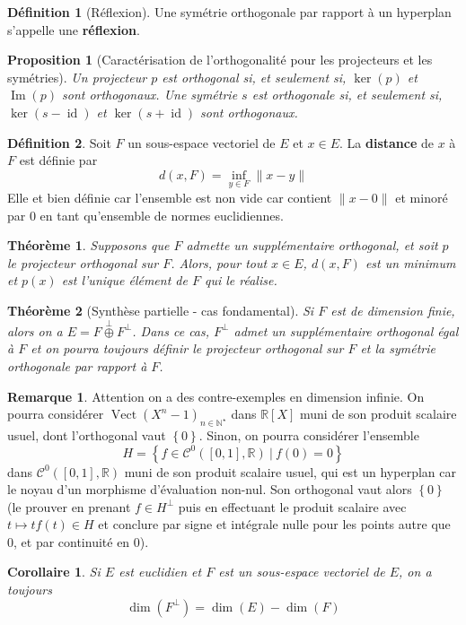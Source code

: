 \documentclass[french]{book}
\newcommand{\N}{\mathbb{N}}
\newcommand{\R}{\mathbb{R}}
\newcommand{\st}{^\star}
\theoremstyle{plain}
\newtheorem{thm}{Théorème}[chapter]
\newtheorem{prop}{Proposition}[chapter]
\newtheorem{cor}{Corollaire}[chapter]
\theoremstyle{definition}
\newtheorem{dfn}{Définition}[chapter]
\newtheorem{rmq}{Remarque}[chapter]
\theoremstyle{remark}
\DeclareMathOperator{\vect}{Vect}
\DeclareMathOperator{\id}{id}
\DeclareMathOperator{\im}{Im}
\begin{document}
\begin{dfn}[Réflexion]
	Une symétrie orthogonale par rapport à un hyperplan s'appelle une \textbf{réflexion}.
\end{dfn}
\begin{prop}[Caractérisation de l'orthogonalité pour les projecteurs et les symétries]
	Un projecteur $p$ est orthogonal si, et seulement si, $\ker(p)$ et $\im(p)$ sont orthogonaux. Une symétrie $s$ est orthogonale si, et seulement si, $\ker(s-\id)$ et $\ker(s+\id)$ sont orthogonaux.
\end{prop}
\begin{dfn}
	Soit $F$ un sous-espace vectoriel de $E$ et $x\in E$. La \textbf{distance} de $x$ à $F$ est définie par $$d(x,F)=\underset{y\in F}{\inf}\lVert x-y\rVert$$ Elle et bien définie car l'ensemble est non vide car contient $\lVert x-0\rVert$ et minoré par $0$ en tant qu'ensemble de normes euclidiennes.
\end{dfn}
\begin{thm}
	Supposons que $F$ admette un supplémentaire orthogonal, et soit $p$ le projecteur orthogonal sur $F$. Alors, pour tout $x\in E$, $d(x,F)$ est un minimum et $p(x)$ est l'unique élément de $F$ qui le réalise.
\end{thm}
\begin{thm}[Synthèse partielle - cas fondamental]
	Si $F$ est de dimension finie, alors on a $E=F\overset{\perp}{\oplus}F^\perp$. Dans ce cas, $F^\perp$ admet un supplémentaire orthogonal égal à $F$ et on pourra toujours définir le projecteur orthogonal sur $F$ et la symétrie orthogonale par rapport à $F$.
\end{thm}
\begin{rmq} Attention on a des contre-exemples en dimension infinie. On pourra considérer $\vect(X^n-1)_{n\in\N\st}$ dans $\R[X]$ muni de son produit scalaire usuel, dont l'orthogonal vaut $\left\{0\right\}$. Sinon, on pourra considérer l'ensemble $$H=\left\{f\in\mathcal{C}^0([0,1],\R) \ | \ f(0)=0\right\}$$ dans $\mathcal{C}^0([0,1],\R)$ muni de son produit scalaire usuel, qui est un hyperplan car le noyau d'un morphisme d'évaluation non-nul. Son orthogonal vaut alors $\left\{0\right\}$ (le prouver en prenant $f\in H^\perp$ puis en effectuant le produit scalaire avec $t\mapsto tf(t) \in H$ et conclure par signe et intégrale nulle pour les points autre que 0, et par continuité en 0). \end{rmq}
\begin{cor}
	Si $E$ est euclidien et $F$ est un sous-espace vectoriel de $E$, on a toujours $$\dim(F^\perp)=\dim(E)-\dim(F)$$
\end{cor}
\end{document}
